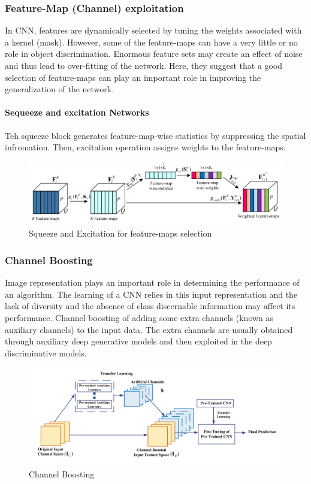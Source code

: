 \subsubsection{Feature-Map (Channel) exploitation}
In CNN, features are dynamically selected  by tuning the weights associated with a kernel (mask). However, some of the feature-maps can have a very little or no role in object discrimination. Enormous feature sets may create an effect of noise and thus lead to over-fitting of the network.
Here, they suggest that a good selection of feature-maps can play an important role in improving the generalization of the network.

\paragraph{Sequeeze and excitation Networks}
Teh squeeze block generates feature-map-wise statistics by suppressing the spatial infromation. Then, excitation operation assigns weights to the feature-maps.

\begin{figure}[H]
    \centering
    \includegraphics[scale=0.3]{content/squeeze_excitation.png}
    \caption{Squeeze and Excitation for feature-maps selection}
    \label{fig:squeeze_excitation}
\end{figure}


\subsubsection{Channel Boosting}
Image representation plays an important role in determining the performance of an algorithm. The learning of a CNN relies in this input representation and the lack of diversity and the absence of class discernable information may affect its performance.
Channel boosting of adding some extra channels (known as auxiliary channels) to the input data. The extra channels are usually obtained through auxiliary deep generative models and then exploited in the deep discriminative models. 


\begin{figure}[H]
    \centering
    \includegraphics[scale=0.3]{content/channel_boosting.png}
    \caption{Channel Boosting}
    \label{fig:channel_boosting}
\end{figure}


